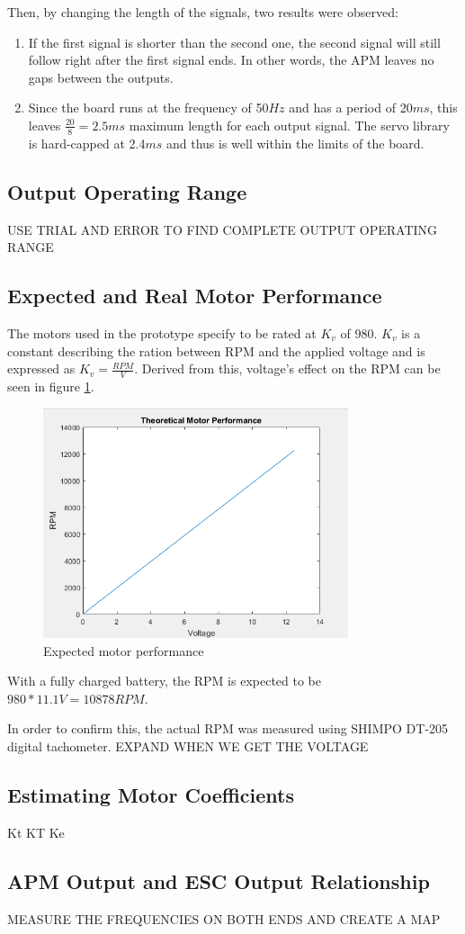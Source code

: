 Then, by changing the length of the signals, two results were observed:
\begin{enumerate}
\item If the first signal is shorter than the second one, the second signal will still follow right after the first signal ends. In other words, the APM leaves no gaps between the outputs.
\item Since the board runs at the frequency of 50$Hz$ and has a period of 20$ms$, this leaves $\frac{20}{8} = 2.5ms$ maximum length for each output signal. The servo library is hard-capped at 2.4$ms$ and thus is well within the limits of the board.
\end{enumerate}

\subsection{Output Operating Range}

USE TRIAL AND ERROR TO FIND COMPLETE OUTPUT OPERATING RANGE

\subsection{Expected and Real Motor Performance}
The motors used in the prototype specify to be rated at $K_v$ of 980. $K_v$ is a constant describing the ration between RPM and the applied voltage and is expressed as $K_v = \frac{RPM}{V}$. Derived from this, voltage's effect on the RPM can be seen in figure \ref{KvPlot}.
\begin{figure}[H]
  \centering
    \includegraphics[width=0.8\textwidth]{images/KvPlot.png}
	\caption{Expected motor performance}
	\label{KvPlot}
\end{figure}
With a fully charged battery, the RPM is expected to be $980*11.1V = 10878 RPM$.

In order to confirm this, the actual RPM was measured using SHIMPO DT-205 digital tachometer. EXPAND WHEN WE GET THE VOLTAGE

\subsection{Estimating Motor Coefficients}
Kt
KT
Ke

\subsection{APM Output and ESC Output Relationship}

MEASURE THE FREQUENCIES ON BOTH ENDS AND CREATE A MAP